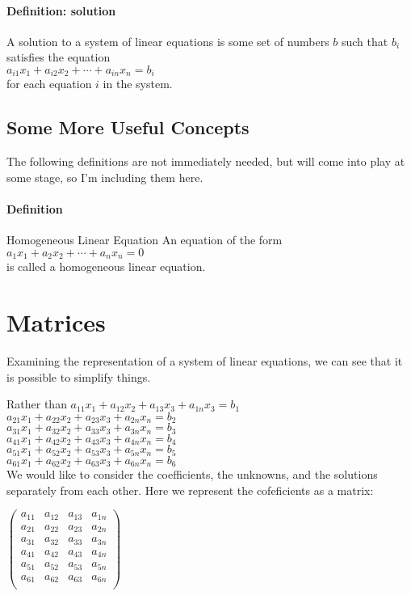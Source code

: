 \documentclass[12pt,letterpaper,final]{article}
\begin{document}
\paragraph{Definition: solution} A solution to a system of linear equations is some set of numbers $b$ such that $b_i$ satisfies the equation \\
$a_{i1}x_1 + a_{i2}x_2 + \cdots + a_{in}x_n = b_i$\\
for each equation $i$ in the system. 

\subsection{Some More Useful Concepts}
The following definitions are not immediately needed, but will come into play at some stage, so I'm including them here. 
\paragraph{Definition} Homogeneous Linear Equation
An equation of the form \\
$a_1x_1 + a_2x_2 + \cdots + a_nx_n = 0$\\
is called a homogeneous linear equation. 


\section{Matrices}
Examining the representation of a system of linear equations, we can see that it is possible to simplify things.

Rather than 
$a_{11}x_1 + a_{12}x_2 + a_{13}x_3  + a_{1n}x_3 = b_1$\\
$a_{21}x_1 + a_{22}x_2 + a_{23}x_3  + a_{2n}x_n = b_2$\\
$a_{31}x_1 + a_{32}x_2 + a_{33}x_3  + a_{3n}x_n = b_3$\\
$a_{41}x_1 + a_{42}x_2 + a_{43}x_3  + a_{4n}x_n = b_4$\\
$a_{51}x_1 + a_{52}x_2 + a_{53}x_3  + a_{5n}x_n = b_5$\\
$a_{61}x_1 + a_{62}x_2 + a_{63}x_3  + a_{6n}x_n = b_6$\\

We would like to consider the coefficients, the unknowns, and the solutions separately from each other. Here we represent the cofeficients as a matrix:

$
 \begin{pmatrix}
a_{11} &  a_{12} &  a_{13} &   a_{1n} \\
a_{21}  & a_{22} &  a_{23} &   a_{2n}\\
a_{31} & a_{32} &   a_{33} &   a_{3n}\\   
a_{41}& a_{42} &  a_{43} &   a_{4n}\\
a_{51} &a_{52} &   a_{53} &   a_{5n}\\
a_{61} &a_{62} &   a_{63} &   a_{6n}\\
 \end{pmatrix}
$
\end{document}
